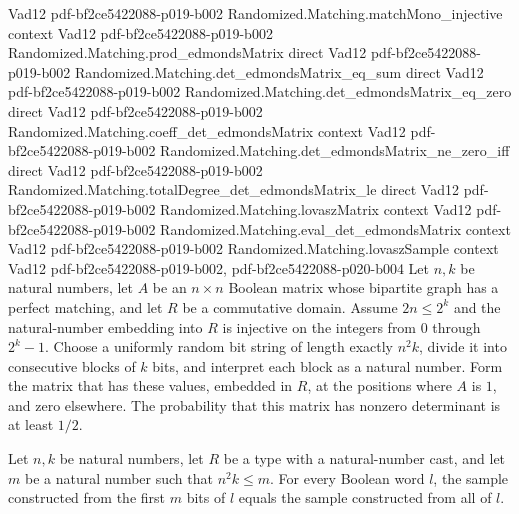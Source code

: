 \begin{theorem}
  {Vad12}
  {pdf-bf2ce5422088-p019-b002}
\proofstep
  {Randomized.Matching.matchMono_injective}
  {context}
  {Vad12}
  {pdf-bf2ce5422088-p019-b002}
\proofstep
  {Randomized.Matching.prod_edmondsMatrix}
  {direct}
  {Vad12}
  {pdf-bf2ce5422088-p019-b002}
\proofstep
  {Randomized.Matching.det_edmondsMatrix_eq_sum}
  {direct}
  {Vad12}
  {pdf-bf2ce5422088-p019-b002}
\proofstep
  {Randomized.Matching.det_edmondsMatrix_eq_zero}
  {direct}
  {Vad12}
  {pdf-bf2ce5422088-p019-b002}
\proofstep
  {Randomized.Matching.coeff_det_edmondsMatrix}
  {context}
  {Vad12}
  {pdf-bf2ce5422088-p019-b002}
\proofstep
  {Randomized.Matching.det_edmondsMatrix_ne_zero_iff}
  {direct}
  {Vad12}
  {pdf-bf2ce5422088-p019-b002}
\proofstep
  {Randomized.Matching.totalDegree_det_edmondsMatrix_le}
  {direct}
  {Vad12}
  {pdf-bf2ce5422088-p019-b002}
\proofstep
  {Randomized.Matching.lovaszMatrix}
  {context}
  {Vad12}
  {pdf-bf2ce5422088-p019-b002}
\proofstep
  {Randomized.Matching.eval_det_edmondsMatrix}
  {context}
  {Vad12}
  {pdf-bf2ce5422088-p019-b002}
\proofstep
  {Randomized.Matching.lovaszSample}
  {context}
  {Vad12}
  {pdf-bf2ce5422088-p019-b002,
    pdf-bf2ce5422088-p020-b004}
Let $n,k$ be natural numbers, let $A$ be an $n\times n$ Boolean matrix whose bipartite
graph has a perfect matching, and let $R$ be a commutative domain. Assume $2n\le 2^k$
and the natural-number embedding into $R$ is injective on the integers from $0$ through
$2^k-1$. Choose a uniformly random bit string of length exactly $n^2k$, divide it into
consecutive blocks of $k$ bits, and interpret each block as a natural number. Form the
matrix that has these values, embedded in $R$, at the positions where $A$ is $1$, and
zero elsewhere. The probability that this matrix has nonzero determinant is at least
$1/2$.
\end{theorem}

\begin{theorem}
\label{Randomized.Matching.lovaszSample_take}
\leanok
{}
Let $n,k$ be natural numbers, let $R$ be a type with a natural-number cast, and let $m$
be a natural number such that $n^2k\le m$. For every Boolean word $l$, the sample
constructed from the first $m$ bits of $l$ equals the sample constructed from all of
$l$.
\end{theorem}

